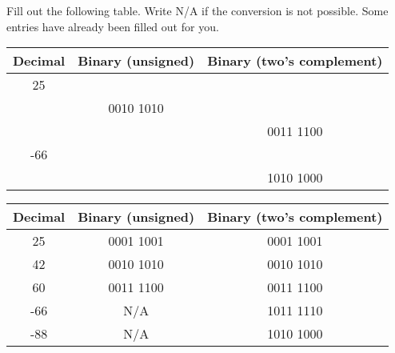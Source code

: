 \begin{blocksection}
\question Fill out the following table. Write N/A if the conversion is not possible. Some entries have already been filled out for you.

\begin{center}
  \begin{tabular}{|c|c|c|}
    \hline
    Decimal & Binary (unsigned) & Binary (two's complement) \\
    \hline\hline
    25 &  &  \\
    \hline
    & 0010 1010 & \\
    \hline
    &  & 0011 1100 \\
    \hline
    -66 &  &  \\
    \hline
    &  & 1010 1000 \\
    \hline
  \end{tabular}
\end{center}

\begin{solution}[2in]
\begin{center}
  \begin{tabular}{|c|c|c|}
    \hline
    Decimal & Binary (unsigned) & Binary (two's complement) \\
    \hline\hline
    25 & 0001 1001 & 0001 1001 \\
    \hline
    42 & 0010 1010 & 0010 1010 \\
    \hline
    60 & 0011 1100 & 0011 1100 \\
    \hline
    -66 & N/A & 1011 1110 \\
    \hline
    -88 & N/A & 1010 1000 \\
    \hline
  \end{tabular}
\end{center}
\end{solution}
\end{blocksection}

